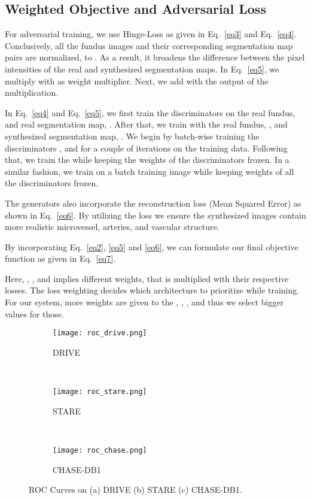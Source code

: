 \documentclass[runningheads]{llncs}
\begin{document}
\subsection{Weighted Objective and Adversarial Loss}
\label{subsec:objective}
\iffalse
With the given multi-scale discriminators, , and generators, , the objective function can be formed as Eq.~\ref{eq3}. It's a multi-objective problem of maximizing the loss of the discriminators while minimizing the loss of the generators. 

\fi
For adversarial training, we use Hinge-Loss \cite{zhang2019self,lim2017geometric} as given in Eq.~\ref{eq3} and Eq.~\ref{eq4}. Conclusively, all the fundus images and their corresponding segmentation map pairs are normalized, to . As a result, it broadens the difference between the pixel intensities of the real and synthesized segmentation maps. In Eq.~\ref{eq5}, we multiply  with  as weight multiplier. Next, we add  with the output of the multiplication.



In Eq.~\ref{eq4} and Eq.~\ref{eq5}, we first train the discriminators on the real fundus,  and real segmentation map, . After that, we train with the real fundus, , and synthesized segmentation map, . We begin by batch-wise training the discriminators , and  for a couple of iterations on the training data. Following that, we train the  while keeping the weights of the discriminators frozen. In a similar fashion, we train  on a batch training image while keeping weights of all the discriminators frozen. 

The generators also incorporate the reconstruction loss (Mean Squared Error) as shown in Eq.~\ref{eq6}. By utilizing the loss we ensure the synthesized images contain more realistic microvessel, arteries, and vascular structure.


By incorporating Eq.~\ref{eq2}, \ref{eq5} and \ref{eq6}, we can formulate our final objective function as given in Eq.~\ref{eq7}.

Here, , , and  implies different weights, that is multiplied with their respective losses. The loss weighting decides which architecture to prioritize while training. For our system, more weights are given to the , , , and thus we select bigger  values for those. 
\begin{figure}[t]
    \centering
    \begin{subfigure}[]{0.3\textwidth}
        \centering
        \texttt{[image: roc\_drive.png]}
        \caption{DRIVE}
    \end{subfigure}~ 
    \begin{subfigure}[]{0.3\textwidth}
        \centering
        \texttt{[image: roc\_stare.png]}
        \caption{STARE}
    \end{subfigure}
    ~ 
    \begin{subfigure}[]{0.3\textwidth}
        \centering
        \texttt{[image: roc\_chase.png]}
        \caption{CHASE-DB1}
    \end{subfigure}
    \caption{ROC Curves on (a) DRIVE (b) STARE (c) CHASE-DB1.}
    \label{fig5}
\end{figure}
\end{document}
